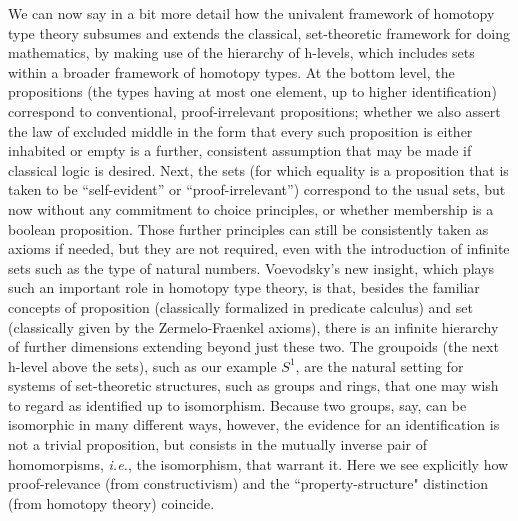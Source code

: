 \documentclass[11pt]{article}
\begin{document}
We can now say in a bit more detail how the univalent framework of homotopy type theory subsumes and extends the
classical, set-theoretic framework for doing mathematics, by making use of the hierarchy of h-levels, which includes
sets within a broader framework of homotopy types.  At the bottom level, the propositions (the types having at most one
element, up to higher identification) correspond to conventional, proof-irrelevant propositions; whether we also assert
the law of excluded middle in the form that every such proposition is either inhabited or empty is a further, consistent
assumption that may be made if classical logic is desired.  Next, the sets (for which equality is a proposition that is
taken to be ``self-evident'' or ``proof-irrelevant'') correspond to the usual sets, but now without any commitment to
choice principles, or whether membership is a boolean proposition.  Those further principles can still be consistently
taken as axioms if needed, but they are not required, even with the introduction of infinite sets such as the type of
natural numbers. Voevodsky's new insight, which plays such an important role in homotopy type theory, is that, besides
the familiar concepts of proposition (classically formalized in predicate calculus) and set (classically given by the
Zermelo-Fraenkel axioms), there is an infinite hierarchy of further dimensions extending beyond just these two.  The
groupoids (the next h-level above the sets), such as our example $S^1$, are the natural setting for systems of
set-theoretic structures, such as groups and rings, that one may wish to regard as identified up to isomorphism.
Because two groups, say, can be isomorphic in many different ways, however, the evidence for an identification is not a
trivial proposition, but consists in the mutually inverse pair of homomorpisms, \textit{i.e.}, the isomorphism, that
warrant it.  Here we see explicitly how proof-relevance (from constructivism) and the ``property-structure" distinction (from homotopy theory) coincide.
\end{document}

